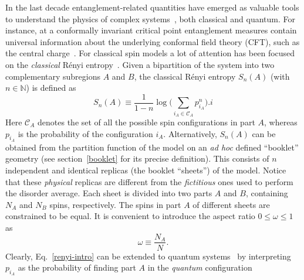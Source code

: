 \documentclass[twocolumn,superscriptaddress,prb,10pt]{revtex4-1}
\begin{document}
In the last decade entanglement-related quantities have emerged as valuable tools to 
understand the physics of complex systems~\cite{amico-2008,eisert-2009,calabrese-2009,
cc-rev}, both classical and quantum. For instance, at a conformally invariant critical 
point entanglement measures contain universal information about the underlying 
conformal field theory (CFT), such as the central charge~\cite{holzhey-1994,vidal-2003,
calabrese-2004,calabrese-2012}. For classical spin models a lot of attention has been 
focused on the \emph{classical} R\'enyi entropy~\cite{jaconis-2013,stephan-2014}. Given 
a bipartition of the system into two complementary subregions $A$ and $B$, the classical 
R\'enyi entropy $S_n(A)$ (with $n\in\mathbb{N}$) is defined as 
%
\begin{equation}
S_n(A)\equiv \frac{1}{1-n}\log\Big(\sum\limits_{i_A\in{\mathcal C}_A} p^n_{i_A}
\Big).i 
\label{renyi-intro}
\end{equation}
%
Here ${\mathcal C}_A$ denotes the set of all the possible spin configurations in part 
$A$, whereas $p_{i_A}$ is the probability of the configuration $i_A$. 
Alternatively, $S_n(A)$ can be obtained from the partition function of the model on 
an \emph{ad hoc} defined ``booklet'' geometry (see section~\ref{booklet} for its 
precise definition). This consists of $n$ independent and identical replicas (the 
booklet ``sheets'') of the model. Notice that these \emph{physical} replicas are different 
from the \emph{fictitious} ones used to perform the disorder average. Each sheet is 
divided into two parts $A$ and $B$, containing $N_A$ and $N_B$ spins, respectively. 
The spins in part $A$ of different sheets are constrained to be equal. It is 
convenient to introduce the aspect ratio $0\le\omega\le1$ as  
%
\begin{equation}
\label{a-ratio}
\omega\equiv \frac{N_A}{N}.
\end{equation}
%
Clearly,  Eq.~\eqref{renyi-intro} can be extended to quantum systems~\cite{stephan-2009,
stephan-2010,stephan-2011,zaletel-2011,alcaraz-2013,stephan-2014-a} by interpreting 
$p_{i_A}$ as the probability of finding part $A$ in the \emph{quantum} configuration 
\end{document}
